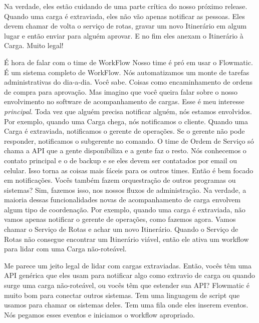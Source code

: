\documentclass[12pt,play]{article}
\begin{document}
Na verdade, eles estão cuidando de uma parte crítica do nosso próximo release. Quando uma carga é extraviada, eles não vão apenas notificar as pessoas. Eles devem chamar de volta o serviço de rotas, gravar um novo Itinerário em algum lugar e então enviar para alguém aprovar. E no fim eles anexam o Itinerário à Carga. Muito legal!
\narr {}

\scene
\narr É hora de falar com o time de WorkFlow
\clau Nosso time é pró em usar o Flowmatic. É um sistema completo de WorkFlow. Nós automatizamos um monte de tarefas administrativas do dia-a-dia. Você sabe. Coisas como encaminhamento de ordens de compra para aprovação. Mas imagino que você queira falar sobre o nosso envolvimento no software de acompanhamento de cargas.
\dani Esse é meu interesse \emph{principal}.
\clau Toda vez que alguém precisa notificar alguém, nós estamos envolvidos. Por exemplo, quando uma Carga chega, nós notificamos o cliente. Quando uma Carga é extraviada, notificamos o gerente de operações. Se o gerente não pode responder, notificamos o subgerente no comando. O time de Ordem de Serviço só chama a API que a gente disponibiliza e a gente faz o resto. Nós conhecemos o contato principal e o de backup e se eles devem ser contatados por email ou celular. Isso torna as coisas mais fáceis para os outros times.
\dani Então é bem focado em notificações. Vocês também fazem orquestração de outros programas ou sistemas?
\clau Sim, fazemos isso, nos nossos fluxos de administração. Na verdade, a maioria dessas funcionalidades novas de acompanhamento de carga envolvem algum tipo de coordenação. Por exemplo, quando uma carga é extraviada, não vamos apenas notificar o gerente de operações, como fazemos agora. Vamos chamar o Serviço de Rotas e achar um novo Itinerário. Quando o Serviço de Rotas não consegue encontrar um Itinerário viável, então ele ativa um workflow para lidar com uma Carga não-roteável.

\narr {}


\dani Me parece um jeito legal de lidar com cargas extraviadas. Então, vocês têm uma API genérica que eles usam para notificar algo como extravio de carga ou quando surge uma carga não-roteável, ou vocês têm que estender sua API?
\clau Flowmatic é muito bom para conectar outros sistemas. Tem uma linguagem de script que usamos para chamar os sistemas deles. Tem uma fila onde eles inserem eventos. Nós pegamos esses eventos e iniciamos o workflow apropriado.
\end{document}

